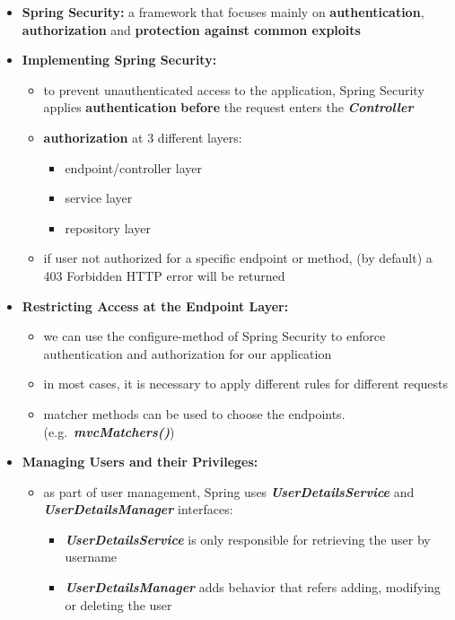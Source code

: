 \documentclass[ieeetran]{article}
\begin{document}
\begin{itemize}
\begin{itemize}
	\end{itemize}
\item \textbf{Spring Security:} a framework that focuses mainly on \textbf{authentication}, \textbf{authorization} and \textbf{protection against common exploits}

\item \textbf{Implementing Spring Security:}
	\begin{itemize}
	  \item to prevent unauthenticated access to the application, Spring Security applies \textbf{authentication} \textbf{before} the request enters the \textit{\textbf{Controller}}
	\item \textbf{authorization} at 3 different layers:
		\begin{itemize}
		  \item endpoint/controller layer
		\item service layer
		\item repository layer
		\end{itemize}

	\item if user not authorized for a specific endpoint or method, (by default) a 403 Forbidden HTTP error will be returned
	\end{itemize}

\item \textbf{Restricting Access at the Endpoint Layer:}
	\begin{itemize}
	  \item we can use the configure-method of Spring Security to enforce authentication and authorization for our application
	\item in most cases, it is necessary to apply different rules for different requests
	\item matcher methods can be used to choose the endpoints. (e.g.\ \textit{\textbf{mvcMatchers()}})
	\end{itemize}

\item \textbf{Managing Users and their Privileges:}
	\begin{itemize}
	  \item as part of user management, Spring uses \textbf{\textit{UserDetailsService}} and \textbf{\textit{UserDetailsManager}} interfaces:
		  \begin{itemize}
		    \item \textit{\textbf{UserDetailsService}} is only responsible for retrieving the user by username
			\item \textit{\textbf{UserDetailsManager}} adds behavior that refers adding, modifying or deleting the user
		  \end{itemize}


\end{itemize}
\end{itemize}
\end{document}
